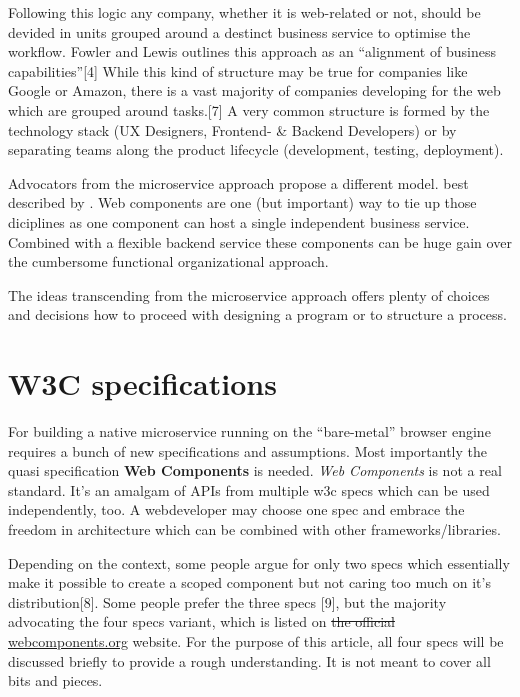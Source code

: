 \documentclass[]{assets/latex/ieee}
\begin{document}
Following this logic any company, whether it is web-related or not,
should be devided in units grouped around a destinct business service to
optimise the workflow. Fowler and Lewis outlines this approach as an
``alignment of business capabilities''{[}4{]} While this kind of
structure may be true for companies like Google or Amazon, there is a
vast majority of companies developing for the web which are grouped
around tasks.{[}7{]} A very common structure is formed by the technology
stack (UX Designers, Frontend- \& Backend Developers) or by separating
teams along the product lifecycle (development, testing, deployment).

Advocators from the microservice approach propose a different model.
best described by . Web components are one (but important) way to tie up
those diciplines as one component can host a single independent business
service. Combined with a flexible backend service these components can
be huge gain over the cumbersome functional organizational approach.

The ideas transcending from the microservice approach offers plenty of
choices and decisions how to proceed with designing a program or to
structure a process.

\section{W3C specifications}\label{w3c-specifications}

For building a native microservice running on the ``bare-metal'' browser
engine requires a bunch of new specifications and assumptions. Most
importantly the quasi specification \textbf{Web Components} is needed.
\emph{Web Components} is not a real standard. It's an amalgam of APIs
from multiple w3c specs which can be used independently, too. A
webdeveloper may choose one spec and embrace the freedom in architecture
which can be combined with other frameworks/libraries.

Depending on the context, some people argue for only two specs which
essentially make it possible to create a scoped component but not caring
too much on it's distribution{[}8{]}. Some people prefer the three specs
{[}9{]}, but the majority advocating the four specs variant, which is
listed on \sout{the official}
\href{http://webcomponents.org}{webcomponents.org} website. For the
purpose of this article, all four specs will be discussed briefly to
provide a rough understanding. It is not meant to cover all bits and
pieces.
\end{document}
